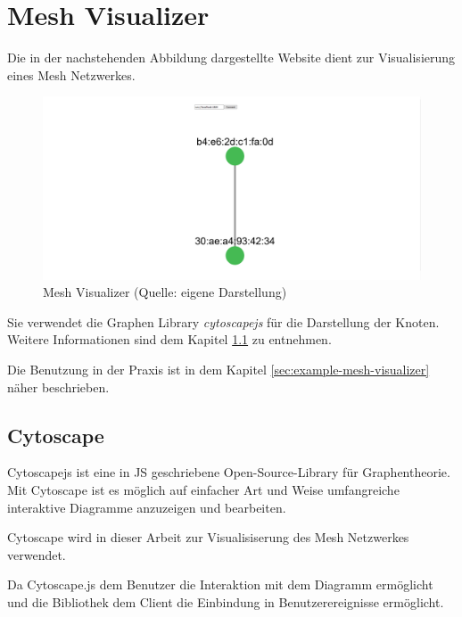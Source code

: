 \cite{esp-mesh}

\section{Mesh Visualizer}\label{sec:mesh-visualizer}

Die in der nachstehenden Abbildung dargestellte Website dient zur Visualisierung eines Mesh Netzwerkes. 

\begin{figure}[H] \begin{center}
        \includegraphics[scale=0.3]{images/example_result_mesh_visualizer.png}
        \caption{Mesh Visualizer (Quelle: eigene Darstellung)}
        \label{abb:mesh_visualizer}
    \end{center}    
\end{figure}

Sie verwendet die Graphen Library \textit{cytoscapejs} für die Darstellung der Knoten. Weitere Informationen sind dem Kapitel \ref{sec:cytoscape} zu entnehmen. 

Die Benutzung in der Praxis ist in dem Kapitel \ref{sec:example-mesh-visualizer} näher beschrieben.

\subsection{Cytoscape}\label{sec:cytoscape}

Cytoscapejs ist eine in JS geschriebene Open-Source-Library für Graphentheorie.
Mit Cytoscape ist es möglich auf einfacher Art und Weise umfangreiche interaktive Diagramme anzuzeigen und bearbeiten. \cite{cytoscape_intro}

Cytoscape wird in dieser Arbeit zur Visualisiserung des Mesh Netzwerkes verwendet.

Da Cytoscape.js dem Benutzer die Interaktion mit dem Diagramm ermöglicht und die Bibliothek dem Client die Einbindung in Benutzerereignisse ermöglicht. 

